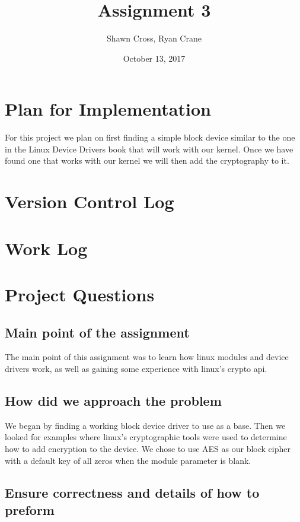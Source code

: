\documentclass[letterpaper,10pt,titlepage]{article}
\begin{document}
\title{Assignment 3}
\date{October 13, 2017}
\author{Shawn Cross, Ryan Crane}
\maketitle

\section{Plan for Implementation}

For this project we plan on first finding a simple block device similar to the 
one in the Linux Device Drivers book that will work with our kernel. Once we 
have found one that works with our kernel we will then add the cryptography to 
it. 

\section{Version Control Log}

\section{Work Log}

\section{Project Questions}

\subsection{Main point of the assignment}
The main point of this assignment was to learn how linux modules and device drivers work, 
as well as gaining some experience with linux's crypto api. 
\subsection{How did we approach the problem}
We began by finding a working block device driver to use as a base. Then we looked for examples 
where linux's cryptographic tools were used to determine how to add encryption to the device. We chose
 to use AES as our block cipher with a default key of all zeros when the module parameter is blank.
\subsection{Ensure correctness and details of how to preform}
\end{document}
